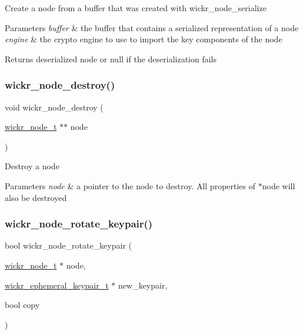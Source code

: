 Create a node from a buffer that was created with \textquotesingle{}wickr\+\_\+node\+\_\+serialize\textquotesingle{}


\begin{DoxyParams}{Parameters}
{\em buffer} & the buffer that contains a serialized representation of a node \\
\hline
{\em engine} & the crypto engine to use to import the key components of the node \\
\hline
\end{DoxyParams}
\begin{DoxyReturn}{Returns}
deserialized node or null if the deserialization fails 
\end{DoxyReturn}
\mbox{\label{group__wickr__node_ga6acf07885403d9df6baad36a8d797f73}} 
\subsubsection{\texorpdfstring{wickr\_node\_destroy()}{wickr\_node\_destroy()}}
{\footnotesize\ttfamily void wickr\+\_\+node\+\_\+destroy (\begin{DoxyParamCaption}\item[{\mbox{\hyperlink{structwickr__node}{wickr\+\_\+node\+\_\+t}} $\ast$$\ast$}]{node }\end{DoxyParamCaption})}

Destroy a node


\begin{DoxyParams}{Parameters}
{\em node} & a pointer to the node to destroy. All properties of \textquotesingle{}$\ast$node\textquotesingle{} will also be destroyed \\
\hline
\end{DoxyParams}
\mbox{\label{group__wickr__node_ga2ed650b947df7316cf0f915805ac5aa4}} 
\subsubsection{\texorpdfstring{wickr\_node\_rotate\_keypair()}{wickr\_node\_rotate\_keypair()}}
{\footnotesize\ttfamily bool wickr\+\_\+node\+\_\+rotate\+\_\+keypair (\begin{DoxyParamCaption}\item[{\mbox{\hyperlink{structwickr__node}{wickr\+\_\+node\+\_\+t}} $\ast$}]{node,  }\item[{\mbox{\hyperlink{structwickr__ephemeral__keypair}{wickr\+\_\+ephemeral\+\_\+keypair\+\_\+t}} $\ast$}]{new\+\_\+keypair,  }\item[{bool}]{copy }\end{DoxyParamCaption})}

